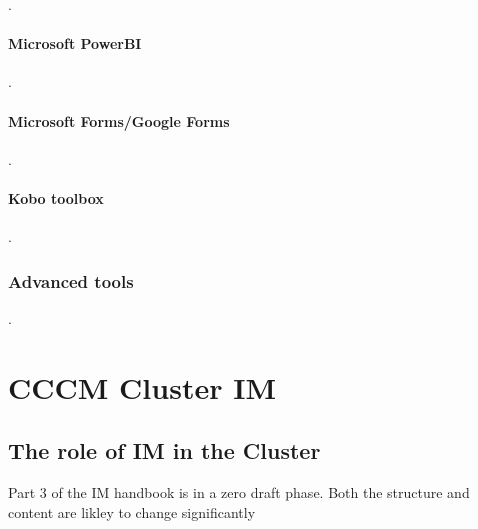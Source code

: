 \documentclass[
  a4paper,
  onecolumn,
  oneside]{book}
\begin{document}
.

\hypertarget{microsoft-powerbi}{%
\subsection{Microsoft PowerBI}\label{microsoft-powerbi}}

.

\hypertarget{microsoft-formsgoogle-forms}{%
\subsection{Microsoft Forms/Google
Forms}\label{microsoft-formsgoogle-forms}}

.

\hypertarget{kobo-toolbox}{%
\subsection{Kobo toolbox}\label{kobo-toolbox}}

.

\hypertarget{advanced-tools}{%
\section{Advanced tools}\label{advanced-tools}}

.

\part{CCCM Cluster IM}

\hypertarget{the-role-of-im-in-the-cluster}{%
\chapter{The role of IM in the
Cluster}\label{the-role-of-im-in-the-cluster}}

\begin{tcolorbox}[enhanced jigsaw, left=2mm, rightrule=.15mm, arc=.35mm, coltitle=black, opacityback=0, colframe=quarto-callout-warning-color-frame, breakable, toprule=.15mm, titlerule=0mm, leftrule=.75mm, opacitybacktitle=0.6, title=\textcolor{quarto-callout-warning-color}{\faExclamationTriangle}\hspace{0.5em}{Warning}, bottomtitle=1mm, toptitle=1mm, bottomrule=.15mm, colbacktitle=quarto-callout-warning-color!10!white, colback=white]

Part 3 of the IM handbook is in a zero draft phase. Both the structure
and content are likley to change significantly

\end{tcolorbox}
\end{document}
